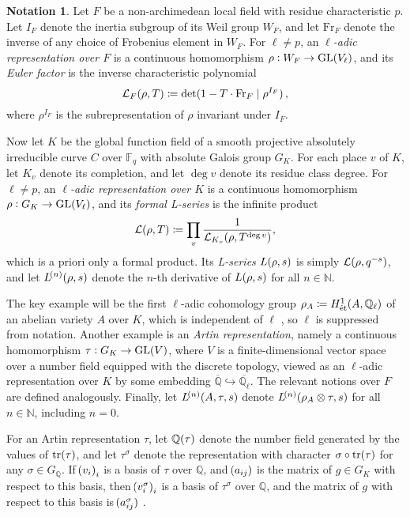 \documentclass{article}
\theoremstyle{definition}
\theoremstyle{definition}
\newtheorem{notation}[n]{Notation}
\newcommand{\et}{\text{\'et}}
\newcommand{\FF}{\mathbb{F}}
\newcommand{\Fr}{\mathrm{Fr}}
\newcommand{\GL}{\mathrm{GL}}
\newcommand{\LLL}{\mathcal{L}}
\newcommand{\NN}{\mathbb{N}}
\newcommand{\QQ}{\mathbb{Q}}
\newcommand{\st}{\mid}
\newcommand{\tr}{\mathrm{tr}}
\newcommand{\br}{\!\del[0]}
\begin{document}
\pagebreak

\begin{notation}
Let $ F $ be a non-archimedean local field with residue characteristic $ p $. Let $ I_F $ denote the inertia subgroup of its Weil group $ W_F $, and let $ \Fr_F $ denote the inverse of any choice of Frobenius element in $ W_F $. For $ \ell \ne p $, an \emph{$ \ell $-adic representation over $ F $} is a continuous homomorphism $ \rho : W_F \to \GL\br{V_\ell} $, and its \emph{Euler factor} is the inverse characteristic polynomial
$$ \LLL_F\br{\rho, T} \coloneqq \det\br{1 - T \cdot \Fr_F \st \rho^{I_F}}, $$
where $ \rho^{I_F} $ is the subrepresentation of $ \rho $ invariant under $ I_F $.

Now let $ K $ be the global function field of a smooth projective absolutely irreducible curve $ C $ over $ \FF_q $ with absolute Galois group $ G_K $. For each place $ v $ of $ K $, let $ K_v $ denote its completion, and let $ \deg v $ denote its residue class degree. For $ \ell \ne p $, an \emph{$ \ell $-adic representation over $ K $} is a continuous homomorphism $ \rho : G_K \to \GL\br{V_\ell} $, and its \emph{formal L-series} is the infinite product
$$ \LLL\br{\rho, T} \coloneqq \prod_v \dfrac{1}{\LLL_{K_v}\br{\rho, T^{\deg v}}}, $$
which is a priori only a formal product. Its \emph{L-series} $ L\br{\rho, s} $ is simply $ \LLL\br{\rho, q^{-s}} $, and let $ L^{\br{n}}\br{\rho, s} $ denote the $ n $-th derivative of $ L\br{\rho, s} $ for all $ n \in \NN $.

The key example will be the first $ \ell $-adic cohomology group $ \rho_A \coloneqq H_\et^1\br{A, \QQ_\ell} $ of an abelian variety $ A $ over $ K $, which is independent of $ \ell $ \cite[Theorem 4.3]{GR72}, so $ \ell $ is suppressed from notation. Another example is an \emph{Artin representation}, namely a continuous homomorphism $ \tau : G_K \to \GL\br{V} $, where $ V $ is a finite-dimensional vector space over a number field equipped with the discrete topology, viewed as an $ \ell $-adic representation over $ K $ by some embedding $ \overline{\QQ} \hookrightarrow \overline{\QQ_\ell} $. The relevant notions over $ F $ are defined analogously. Finally, let $ L^{\br{n}}\br{A, \tau, s} $ denote $ L^{\br{n}}\br{\rho_A \otimes \tau, s} $ for all $ n \in \NN $, including $ n = 0 $.

For an Artin representation $ \tau $, let $ \QQ\br{\tau} $ denote the number field generated by the values of $ \tr\br{\tau} $, and let $ \tau^\sigma $ denote the representation with character $ \sigma \circ \tr\br{\tau} $ for any $ \sigma \in G_\QQ $. If $ \br{v_i}_i $ is a basis of $ \tau $ over $ \QQ $, and $ \br{a_{ij}} $ is the matrix of $ g \in G_K $ with respect to this basis, then $ \br{v_i^\sigma}_i $ is a basis of $ \tau^\sigma $ over $ \QQ $, and the matrix of $ g $ with respect to this basis is $ \br{a_{ij}^{\sigma}} $ \cite[Section 2.1.4]{Eva21}.
\end{notation}
\end{document}
